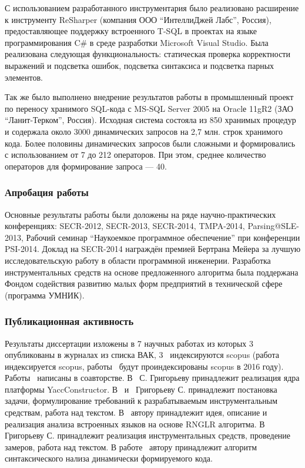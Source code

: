 С использованием разработанного инструментария было реализовано расширение к инструменту ReSharper (компания ООО ``ИнтеллиДжей Лабс'', Россия), предоставляющее поддержку встроенного T-SQL в проектах на языке программирования C\# в среде разработки Microsoft Visual Studio. Была реализована следующая функциональность: статическая проверка корректности выражений и подсветка ошибок, подсветка синтаксиса и подсветка парных элементов.

Так же было выполнено внедрение результатов работы в промышленный проект по переносу хранимого SQL-кода с MS-SQL Server 2005 на Oraclе 11gR2 (ЗАО ``Ланит-Терком'', Россия). Исходная система состояла из 850 хранимых процедур и содержала около 3000 динамических запросов на 2,7 млн. строк хранимого кода. Более половины динамических запросов были сложными и формировались с использованием от 7 до 212 операторов. При этом, среднее количество операторов для формирование запроса ---  40.


\subsubsection*{\large{Апробация работы}}

Основные результаты работы были доложены на ряде научно-практических конференциях: SECR-2012, SECR-2013, SECR-2014, TMPA-2014, Parsing@SLE-2013, Рабочий семинар ``Наукоемкое программное обеспечение'' при конференции PSI-2014. Доклад на SECR-2014 награждён премией Бертрана Мейера за лучшую исследовательскую работу в области программной инженерии. Разработка инструментальных средств на основе предложенного алгоритма была поддержана Фондом содействия развитию малых форм предприятий в технической сфере (программа УМНИК).

\subsubsection*{\large{Публикационная активность}}

Результаты диссертации изложены в 7 научных работах из которых 3~\cite{1,2,3} опубликованы в журналах из списка ВАК, 3~\cite{4,5,7} индексируются scopus (работа~\cite{4} индексируется scopus, работы~\cite{5, 7} будут проиндексированы scopus в 2016 году). Работы~\cite{1, 2, 3, 4, 5, 6, 7} написаны в соавторстве. В~\cite{1} С. Григорьеву принадлежит реализация ядра платформы YaccConstructor. В~\cite{2, 3} и~\cite{5} Григорьеву С. принадлежит постановка задачи, формулирование требований к разрабатываемым инструментальным средствам, работа над текстом. В~\cite{4} автору принадлежит идея, описание и реализация анализа встроенных языков на основе RNGLR алгоритма.  В~\cite{6} Григорьеву С. принадлежит реализация инструментальных средств, проведение замеров, работа над текстом. В работе~\cite{7} автору принадлежит алгоритм синтаксического нализа динамически формируемого кода.


